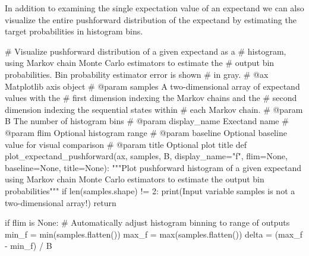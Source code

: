 \documentclass[
  letterpaper,
  DIV=11,
  numbers=noendperiod]{scrartcl}
\newenvironment{Shaded}{\begin{snugshade}}{\end{snugshade}}
\newcommand{\BuiltInTok}[1]{\textcolor[rgb]{0.00,0.23,0.31}{#1}}
\newcommand{\CommentTok}[1]{\textcolor[rgb]{0.37,0.37,0.37}{#1}}
\newcommand{\ControlFlowTok}[1]{\textcolor[rgb]{0.00,0.23,0.31}{#1}}
\newcommand{\DecValTok}[1]{\textcolor[rgb]{0.68,0.00,0.00}{#1}}
\newcommand{\KeywordTok}[1]{\textcolor[rgb]{0.00,0.23,0.31}{#1}}
\newcommand{\NormalTok}[1]{\textcolor[rgb]{0.00,0.23,0.31}{#1}}
\newcommand{\OperatorTok}[1]{\textcolor[rgb]{0.37,0.37,0.37}{#1}}
\newcommand{\StringTok}[1]{\textcolor[rgb]{0.13,0.47,0.30}{#1}}
\newcommand{\VariableTok}[1]{\textcolor[rgb]{0.07,0.07,0.07}{#1}}
\begin{document}
In addition to examining the single expectation value of an expectand we
can also visualize the entire pushforward distribution of the expectand
by estimating the target probabilities in histogram bins.

\begin{Shaded}
\begin{Highlighting}[]
\CommentTok{\# Visualize pushforward distribution of a given expectand as a}
\CommentTok{\# histogram, using Markov chain Monte Carlo estimators to estimate the}
\CommentTok{\# output bin probabilities.  Bin probability estimator error is shown}
\CommentTok{\# in gray.}
\CommentTok{\# @ax Matplotlib axis object}
\CommentTok{\# @param samples A two{-}dimensional array of expectand values with the}
\CommentTok{\#                first dimension indexing the Markov chains and the}
\CommentTok{\#                second dimension indexing the sequential states within}
\CommentTok{\#                each Markov chain.}
\CommentTok{\# @param B The number of histogram bins}
\CommentTok{\# @param display\_name Exectand name}
\CommentTok{\# @param flim Optional histogram range}
\CommentTok{\# @param baseline Optional baseline value for visual comparison}
\CommentTok{\# @param title Optional plot title}
\KeywordTok{def}\NormalTok{ plot\_expectand\_pushforward(ax, samples, B, display\_name}\OperatorTok{=}\StringTok{"f"}\NormalTok{,}
\NormalTok{                               flim}\OperatorTok{=}\VariableTok{None}\NormalTok{, baseline}\OperatorTok{=}\VariableTok{None}\NormalTok{, title}\OperatorTok{=}\VariableTok{None}\NormalTok{):}
  \CommentTok{"""Plot pushforward histogram of a given expectand using Markov chain}
\CommentTok{     Monte Carlo estimators to estimate the output bin probabilities"""}
  \ControlFlowTok{if} \BuiltInTok{len}\NormalTok{(samples.shape) }\OperatorTok{!=} \DecValTok{2}\NormalTok{:}
    \BuiltInTok{print}\NormalTok{(}\StringTok{\textquotesingle{}Input variable \textasciigrave{}samples\textasciigrave{} is not a two{-}dimensional array!\textquotesingle{}}\NormalTok{)}
    \ControlFlowTok{return}
    
  \ControlFlowTok{if}\NormalTok{ flim }\KeywordTok{is} \VariableTok{None}\NormalTok{:}
    \CommentTok{\# Automatically adjust histogram binning to range of outputs}
\NormalTok{    min\_f }\OperatorTok{=} \BuiltInTok{min}\NormalTok{(samples.flatten())}
\NormalTok{    max\_f }\OperatorTok{=} \BuiltInTok{max}\NormalTok{(samples.flatten())}
\NormalTok{    delta }\OperatorTok{=}\NormalTok{ (max\_f }\OperatorTok{{-}}\NormalTok{ min\_f) }\OperatorTok{/}\NormalTok{ B}
\end{Highlighting}
\end{Shaded}
\end{document}
